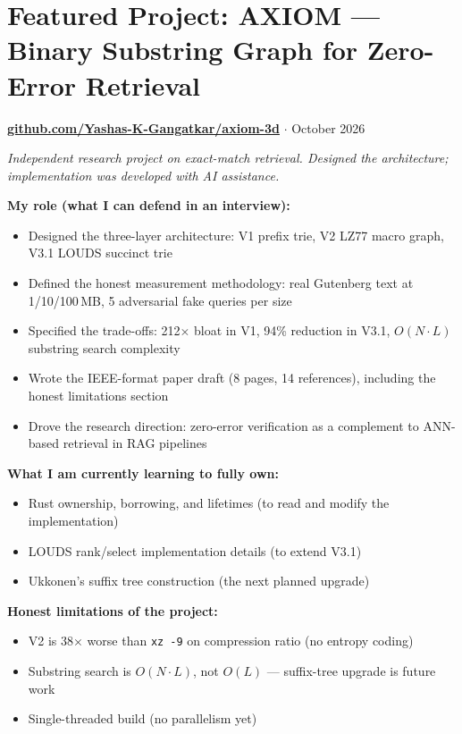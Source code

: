 \documentclass[11pt,a4paper]{article}
\begin{document}
\section*{Featured Project: AXIOM --- Binary Substring Graph for Zero-Error Retrieval}
\href{https://github.com/Yashas-K-Gangatkar/axiom-3d}{\textbf{github.com/Yashas-K-Gangatkar/axiom-3d}} $\cdot$ October 2026

\textit{Independent research project on exact-match retrieval. Designed the architecture; implementation was developed with AI assistance.}

\textbf{My role (what I can defend in an interview):}
\begin{itemize}
\item Designed the three-layer architecture: V1 prefix trie, V2 LZ77 macro graph, V3.1 LOUDS succinct trie
\item Defined the honest measurement methodology: real Gutenberg text at 1/10/100\,MB, 5 adversarial fake queries per size
\item Specified the trade-offs: 212$\times$ bloat in V1, 94\% reduction in V3.1, $O(N \cdot L)$ substring search complexity
\item Wrote the IEEE-format paper draft (8 pages, 14 references), including the honest limitations section
\item Drove the research direction: zero-error verification as a complement to ANN-based retrieval in RAG pipelines
\end{itemize}

\textbf{What I am currently learning to fully own:}
\begin{itemize}
\item Rust ownership, borrowing, and lifetimes (to read and modify the implementation)
\item LOUDS rank/select implementation details (to extend V3.1)
\item Ukkonen's suffix tree construction (the next planned upgrade)
\end{itemize}

\textbf{Honest limitations of the project:}
\begin{itemize}
\item V2 is 38$\times$ worse than \texttt{xz -9} on compression ratio (no entropy coding)
\item Substring search is $O(N \cdot L)$, not $O(L)$ --- suffix-tree upgrade is future work
\item Single-threaded build (no parallelism yet)
\end{itemize}
\end{document}
